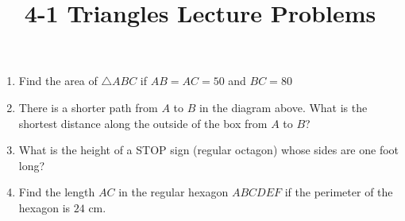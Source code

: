 \documentclass{article}
\title{4-1 Triangles Lecture Problems}
\date{}
\author{}
\begin{document}
\maketitle

\begin{enumerate}
    \item Find the area of $\triangle ABC$ if $AB = AC = 50$ and $BC = 80$
    \vspace{3cm}
    \item There is a shorter path from $A$ to $B$ in the diagram above.
        What is the shortest distance along the outside of the box from $A$ to $B$?
        \begin{center}
        \end{center}
        \vspace{3cm}
    \item What is the height of a STOP sign (regular octagon) whose sides are one foot long?
        \vspace{3cm}
    \item Find the length $AC$ in the regular hexagon $ABCDEF$ if the perimeter of the hexagon is $24$ cm.
        \vspace{3cm}
\end{enumerate}
\end{document}
